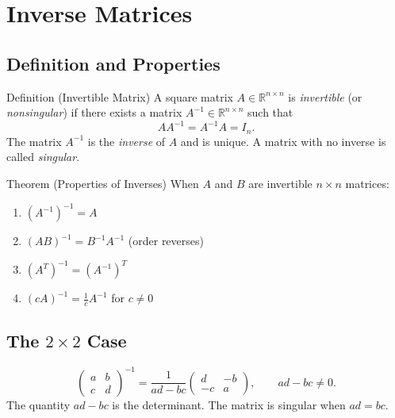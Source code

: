 
\section{Inverse Matrices}

\subsection*{Definition and Properties}

\begin{propositionbox}{Definition (Invertible Matrix)}
A square matrix $A \in \mathbb{R}^{n \times n}$ is \emph{invertible}
(or \emph{nonsingular}) if there exists a matrix $A^{-1} \in \mathbb{R}^{n \times n}$
such that
\[
  AA^{-1} = A^{-1}A = I_n.
\]
The matrix $A^{-1}$ is the \emph{inverse} of $A$ and is unique.
A matrix with no inverse is called \emph{singular}.
\end{propositionbox}

\begin{theorembox}{Theorem (Properties of Inverses)}
When $A$ and $B$ are invertible $n \times n$ matrices:
\begin{enumerate}
  \item $(A^{-1})^{-1} = A$
  \item $(AB)^{-1} = B^{-1}A^{-1}$ \quad (order reverses)
  \item $(A^T)^{-1} = (A^{-1})^T$
  \item $(cA)^{-1} = \tfrac{1}{c} A^{-1}$ for $c \neq 0$
\end{enumerate}
\end{theorembox}

\subsection*{\texorpdfstring{The $2 \times 2$ Case}{The 2 x 2 Case}}

\begin{tcolorbox}[colback=gray!6, colframe=gray!40, arc=2pt,
  left=6pt, right=6pt, top=4pt, bottom=4pt,
  title={\small\textbf{Formula ($2 \times 2$ Inverse)}},
  fonttitle=\small\bfseries]
\[
  \begin{pmatrix} a & b \\ c & d \end{pmatrix}^{-1}
  = \frac{1}{ad - bc} \begin{pmatrix} d & -b \\ -c & a \end{pmatrix},
  \qquad ad - bc \neq 0.
\]
The quantity $ad - bc$ is the determinant. The matrix is singular when $ad = bc$.
\end{tcolorbox}

